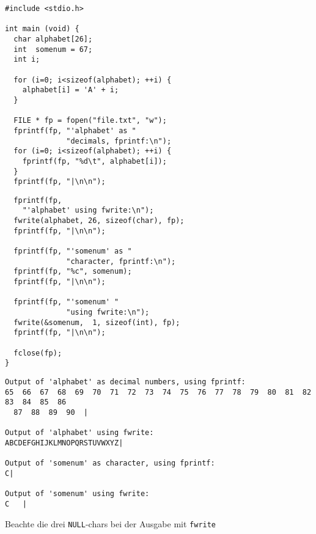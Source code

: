 \begin{frame}[fragile]
%
%
\begin{codebox}
\begin{verbatim}
#include <stdio.h>

int main (void) {
  char alphabet[26];
  int  somenum = 67;
  int i;
  
  for (i=0; i<sizeof(alphabet); ++i) {
    alphabet[i] = 'A' + i;
  }
  
  FILE * fp = fopen("file.txt", "w");    
  fprintf(fp, "'alphabet' as "
              "decimals, fprintf:\n");
  for (i=0; i<sizeof(alphabet); ++i) {
    fprintf(fp, "%d\t", alphabet[i]);
  }
  fprintf(fp, "|\n\n");
\end{verbatim}
\end{codebox}
%
\begin{codebox}[...Fortsetzung]
\begin{verbatim}
  fprintf(fp, 
    "'alphabet' using fwrite:\n");
  fwrite(alphabet, 26, sizeof(char), fp);
  fprintf(fp, "|\n\n");
  
  fprintf(fp, "'somenum' as "
              "character, fprintf:\n");
  fprintf(fp, "%c", somenum);
  fprintf(fp, "|\n\n");
    
  fprintf(fp, "'somenum' "
              "using fwrite:\n");
  fwrite(&somenum,  1, sizeof(int), fp);
  fprintf(fp, "|\n\n");

  fclose(fp);
}
\end{verbatim}
\end{codebox}
%
\end{frame}


\begin{frame}[fragile]
%
\begin{cmdbox}[Dateiausgabe]
\begin{verbatim}
Output of 'alphabet' as decimal numbers, using fprintf:
65  66  67  68  69  70  71  72  73  74  75  76  77  78  79  80  81  82  83  84  85  86
  87  88  89  90  |

Output of 'alphabet' using fwrite:
ABCDEFGHIJKLMNOPQRSTUVWXYZ|

Output of 'somenum' as character, using fprintf:
C|

Output of 'somenum' using fwrite:
C   |
\end{verbatim}
\end{cmdbox}
%
\begin{hintbox}
Beachte die drei \texttt{NULL}-chars bei der Ausgabe mit \texttt{fwrite}
\end{hintbox}
%
\end{frame}

